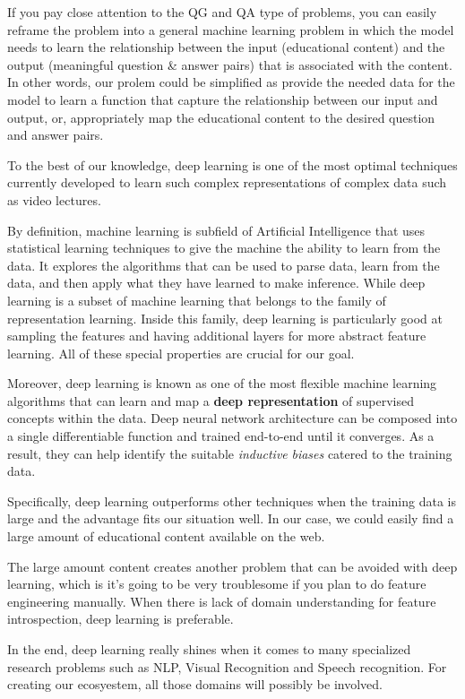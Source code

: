 \documentclass[]{book}
\theoremstyle{definition}
\theoremstyle{definition}
\theoremstyle{definition}
\theoremstyle{remark}
\begin{document}
If you pay close attention to the QG and QA type of problems, you can
easily reframe the problem into a general machine learning problem in
which the model needs to learn the relationship between the input
(educational content) and the output (meaningful question \& answer
pairs) that is associated with the content. In other words, our prolem
could be simplified as provide the needed data for the model to learn a
function that capture the relationship between our input and output, or,
appropriately map the educational content to the desired question and
answer pairs.

To the best of our knowledge, deep learning is one of the most optimal
techniques currently developed to learn such complex representations of
complex data such as video lectures.

By definition, machine learning is subfield of Artificial Intelligence
that uses statistical learning techniques to give the machine the
ability to learn from the data. It explores the algorithms that can be
used to parse data, learn from the data, and then apply what they have
learned to make inference. While deep learning is a subset of machine
learning that belongs to the family of representation learning. Inside
this family, deep learning is particularly good at sampling the features
and having additional layers for more abstract feature learning. All of
these special properties are crucial for our goal.

Moreover, deep learning is known as one of the most flexible machine
learning algorithms that can learn and map a \textbf{deep
representation} of supervised concepts within the data. Deep neural
network architecture can be composed into a single differentiable
function and trained end-to-end until it converges. As a result, they
can help identify the suitable \emph{inductive} \emph{biases} catered to
the training data.

Specifically, deep learning outperforms other techniques when the
training data is large and the advantage fits our situation well. In our
case, we could easily find a large amount of educational content
available on the web.

The large amount content creates another problem that can be avoided
with deep learning, which is it's going to be very troublesome if you
plan to do feature engineering manually. When there is lack of domain
understanding for feature introspection, deep learning is preferable.

In the end, deep learning really shines when it comes to many
specialized research problems such as NLP, Visual Recognition and Speech
recognition. For creating our ecosyestem, all those domains will
possibly be involved.
\end{document}
